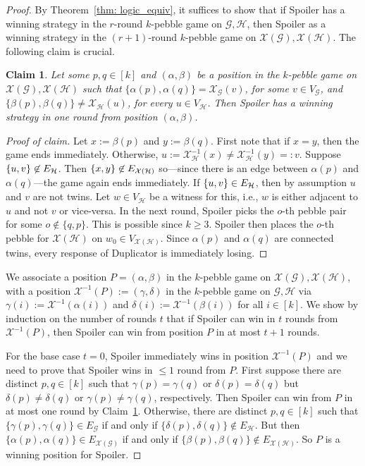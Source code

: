 \documentclass[10pt,a4paper]{article}
\DeclarePairedDelimiter\set{\lbrace}{\rbrace}
\newcommand{\graphG}{\mathcal{G}}
\newcommand{\graphH}{\mathcal{H}}
\newcommand{\vertexG}{V_{\graphG}}
\newcommand{\vertexH}{V_{\graphH}}
\newcommand{\edgeG}{E_{\graphG}}
\newcommand{\edgeH}{E_{\graphH}}
\newcommand{\graphXG}{\mathcal{X}(\mathcal{G})}
\newcommand{\graphXH}{\mathcal{X}(\mathcal{H})}
\newcommand{\vertexXH}{V_{\graphXH}}
\newcommand{\edgeXG}{E_{\graphXG}}
\newcommand{\edgeXH}{E_{\graphXH}}
\newcommand{\X}{\mathcal{X}}
\newcommand{\XG}{\X_{\graphG}}
\newcommand{\XH}{\X_{\graphH}}
\newcommand{\XHI}{\X^{-1}_{\graphH}}
\newcommand{\XI}{\X^{-1}}
\newtheorem{claim}[theorem]{Claim}
\newenvironment{claimproof}{\begin{proof}[Proof of claim]}{\end{proof}}
\begin{document}
%
\begin{proof}
By Theorem~\ref{thm: logic_equiv},
it suffices to show that if Spoiler has a winning strategy in the $r$-round $k$-pebble game on $\graphG, \graphH$, then Spoiler as a winning strategy in the $(r+1)$-round $k$-pebble game on $\graphXG, \graphXH$. The following claim is crucial. 

\begin{claim} \label{claim: respect}
Let some $p,q\in[k]$ and $(\alpha, \beta)$ be a position in the $k$-pebble game on $\graphXG, \graphXH$ such that  $\{\alpha(p), \alpha(q) \} = \XG(v)$, for some $v \in \vertexG$, and $\{\beta(p), \beta(q) \} \neq \XH(u)$, for every $u \in \vertexH$. Then Spoiler has a winning strategy in one round from position $(\alpha, \beta)$.
\end{claim}

\begin{claimproof} 
Let $x:=\beta(p)$ and $y:=\beta(q)$. First note that if $x=y$, then the game ends immediately. Otherwise, $u:=\XHI(x) \neq \XHI(y)=:v$. Suppose $\set{u,v} \not \in \edgeH$. Then $\set{x,y} \not \in \edgeXH$ so---since there is an edge between $\alpha(p)$ and $\alpha(q)$---the game again ends immediately.
If $\set{u,v} \in \edgeH$, then by assumption $u$ and $v$ are not twins.
Let $w \in \vertexH$ be a witness for this, i.e., $w$ is either adjacent to $u$ and not $v$ or vice-versa.
In the next round, Spoiler picks the $o$-th pebble pair for some $o \not \in \{q, p\}$. This is possible since $k\ge 3$. Spoiler then places the $o$-th pebble for $\graphXH$ on $w_0 \in \vertexXH$. Since $\alpha(p)$ and $\alpha(q)$ are connected twins, every response of Duplicator is immediately losing.
\end{claimproof}

We associate a position $P = (\alpha, \beta)$  in the  $k$-pebble game on $\graphXG, \graphXH$, with a position $\XI(P):= (\gamma, \delta) $ in the $k$-pebble game on $\graphG, \graphH$ via $\gamma(i) := \XI(\alpha(i))$ and $\delta(i) := \XI(\beta(i))$ for all $i \in [k]$.
We show by induction on the number of rounds $t$ that if Spoiler can win in $t$ rounds from $\XI(P)$, then Spoiler can win from position $P$ in at most $t+1$ rounds. 

%
%
%
For the base case $t=0$, Spoiler immediately wins in position
$\XI(P)$ and we need to prove that Spoiler wins in $\leq 1$ round from
$P$.
First suppose there are distinct $p,q\in[k]$ such that
$\gamma(p) = \gamma(q)$ or $\delta(p) = \delta(q)$
but $\delta(p) \neq \delta(q)$ or $\gamma(p) \neq \gamma(q)$, respectively.
Then Spoiler can win from $P$ in at most one round by Claim~\ref{claim: respect}. Otherwise, there are distinct $p,q \in [k]$ such that $\{\gamma(p), \gamma(q)\} \in \edgeG$ if and only if $\{\delta(p), \delta(q)\} \not\in \edgeH$. But then $\{\alpha(p), \alpha(q)\} \in \edgeXG$ if and only if $\{\beta(p), \beta(q)\} \not\in \edgeXH$.
So $P$ is a winning position for Spoiler.


\end{proof}
\end{document}
